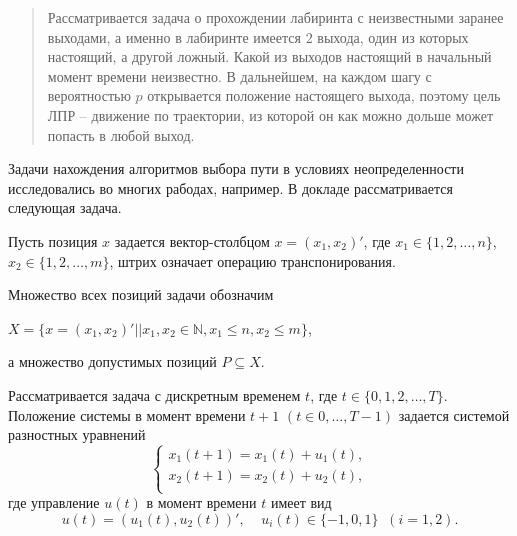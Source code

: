 
\maketitle

\begin{abstract}
Рассматривается задача о прохождении лабиринта с неизвестными заранее выходами, а именно в лабиринте имеется $2$ выхода, один из которых настоящий, а другой ложный. Какой из выходов настоящий в начальный момент времени неизвестно. В дальнейшем, на каждом шагу с вероятностью $p$ открывается положение настоящего выхода, поэтому цель ЛПР --  движение по траектории, из которой он как можно дольше может попасть в любой выход.

\end{abstract}


Задачи нахождения алгоритмов выбора пути в условиях неопределенности исследовались во многих рабодах, например\cite{bar1,bar2}. В докладе рассматривается следующая задача.

Пусть позиция $x$ задается вектор-столбцом $x=(x_1,x_2)'$, где $x_1\in \{1,2,\ldots,n\}$,\\  $x_2\in \{1,2,\ldots,m\}$, штрих означает операцию  транспонирования.

Множество всех позиций задачи обозначим
\begin{center}
 $X=\{x=(x_1,x_2)' || x_1, x_2\in \mathbb{N}, x_1\leq n, x_2\leq m\}$,
\end{center}
а множество допустимых позиций $P \subseteq X$.

Рассматривается задача с дискретным временем $t$, где $t\in\{0,1,2,\ldots,T\}$.
Положение системы в момент времени $t+1$  $(t \in 0, \ldots,T-1)$ задается системой разностных уравнений
\begin{equation} \label{eq1}
		\begin{cases}%
			x_1(t+1)=x_1(t)+u_1(t),\\
			x_2(t+1)=x_2(t)+u_2(t),\\
		\end{cases}
\end{equation}
где управление $u(t)$ в момент времени $t$ имеет вид
\begin{equation} \label{eq2}
u(t)= (u_1(t),u_2(t))', \;\;\;\; u_i(t) \in \{-1,0, 1\} \;\; (i=1,2).
\end{equation}


